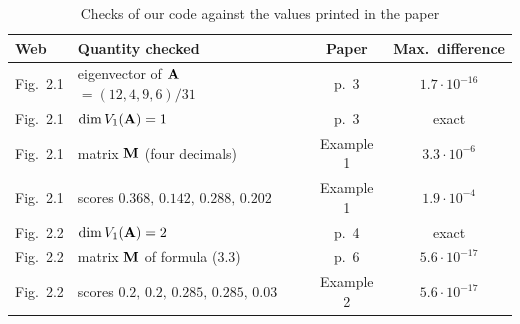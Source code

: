 \begin{table}[H]\centering
\begin{tabular}{llcc}
\toprule
\textbf{Web} & \textbf{Quantity checked} & \textbf{Paper} & \textbf{Max.\ difference} \\
\midrule
Fig.~2.1 & eigenvector of $\mathbf{A}$ $= (12,4,9,6)/31$ & p.~3 & $1.7\cdot10^{-16}$ \\
Fig.~2.1 & $\dim V_1(\mathbf{A}) = 1$ & p.~3 & exact \\
Fig.~2.1 & matrix $\mathbf{M}$ (four decimals) & Example 1 & $3.3\cdot10^{-6}$ \\
Fig.~2.1 & scores $0.368,\,0.142,\,0.288,\,0.202$ & Example 1 & $1.9\cdot10^{-4}$ \\
Fig.~2.2 & $\dim V_1(\mathbf{A}) = 2$ & p.~4 & exact \\
Fig.~2.2 & matrix $\mathbf{M}$ of formula (3.3) & p.~6 & $5.6\cdot10^{-17}$ \\
Fig.~2.2 & scores $0.2,\,0.2,\,0.285,\,0.285,\,0.03$ & Example 2 & $5.6\cdot10^{-17}$ \\
\bottomrule
\end{tabular}
\caption{Checks of our code against the values printed in the paper}
\label{tab:paper-checks}
\end{table}
